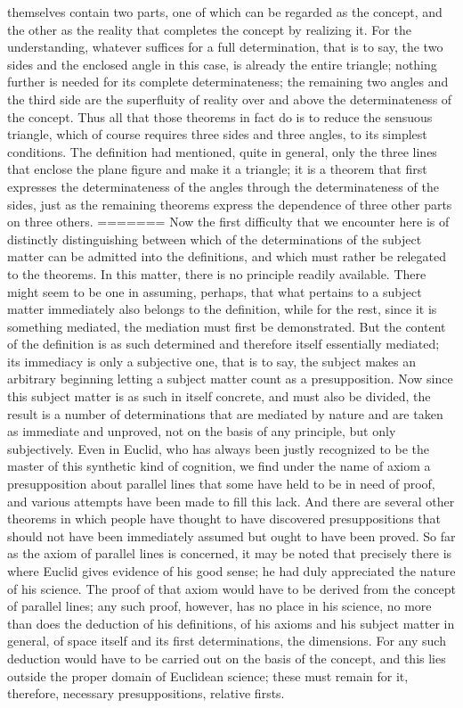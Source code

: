 themselves contain two parts, one of which can be regarded as the concept,
and the other as the reality that completes the concept by realizing it. For the
understanding, whatever suffices for a full determination, that is to say, the
two sides and the enclosed angle in this case, is already the entire triangle;
nothing further is needed for its complete determinateness; the remaining
two angles and the third side are the superfluity of reality over and above
the determinateness of the concept. Thus all that those theorems in fact
do is to reduce the sensuous triangle, which of course requires three sides
and three angles, to its simplest conditions. The definition had mentioned,
quite in general, only the three lines that enclose the plane figure and
make it a triangle; it is a theorem that first expresses the determinateness of
the angles through the determinateness of the sides, just as the remaining
theorems express the dependence of three other parts on three others.
=======
Now the first difficulty that we encounter here is
of distinctly distinguishing between
which of the determinations of the subject matter
can be admitted into the definitions,
and which must rather be relegated to the theorems.
In this matter, there is no principle readily available.
There might seem to be one in assuming, perhaps,
that what pertains to a subject matter
immediately also belongs to the definition,
while for the rest, since it is something mediated,
the mediation must first be demonstrated.
But the content of the definition is as such determined
and therefore itself essentially mediated;
its immediacy is only a subjective one, that is to say,
the subject makes an arbitrary beginning
letting a subject matter count as a presupposition.
Now since this subject matter is as such in itself concrete,
and must also be divided,
the result is a number of determinations
that are mediated by nature
and are taken as immediate and unproved,
not on the basis of any principle,
but only subjectively.
Even in Euclid, who has always been justly recognized
to be the master of this synthetic kind of cognition,
we find under the name of axiom a presupposition
about parallel lines that some have held to be in need of proof,
and various attempts have been made to fill this lack.
And there are several other theorems in which
people have thought to have discovered presuppositions
that should not have been immediately assumed
but ought to have been proved.
So far as the axiom of parallel lines is concerned,
it may be noted that precisely there is
where Euclid gives evidence of his good sense;
he had duly appreciated the nature of his science.
The proof of that axiom would have to be
derived from the concept of parallel lines;
any such proof, however, has no place in his science,
no more than does the deduction of his definitions,
of his axioms and his subject matter in general,
of space itself and its first determinations, the dimensions.
For any such deduction would have to be
carried out on the basis of the concept,
and this lies outside the proper domain
of Euclidean science;
these must remain for it, therefore,
necessary presuppositions, relative firsts.

